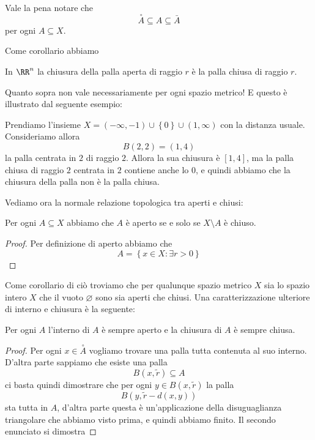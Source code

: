\documentclass[11pt]{scrartcl}
\newcommand{\eset}{\varnothing}
\begin{document}
	\begin{remark}
		Vale la pena notare che 
		$$\overset{\circ}{A}\subseteq A\subseteq \bar{A}$$
		per ogni $A\subseteq X$.
	\end{remark}
	Come corollario abbiamo
	\begin{corollary}
		In $\RR^n$ la chiusura della palla aperta di raggio $r$ è la palla chiusa di raggio $r$.
	\end{corollary}
	Quanto sopra non vale necessariamente per ogni spazio metrico! E questo è illustrato dal seguente esempio:
	\begin{example}
		Prendiamo l'insieme $X=(-\infty,-1)\cup \left\{0\right\}\cup \left(1,\infty\right)$ con la distanza usuale. Consideriamo allora 
		$$B(2,2)=(1,4)$$
		la palla centrata in $2$ di raggio $2$. Allora la sua chiusura è $[1,4]$, ma la palla chiusa di raggio $2$ centrata in $2$ contiene anche lo $0$, e quindi abbiamo che la chiusura della palla non è la palla chiusa.
	\end{example}
	Vediamo ora la normale relazione topologica tra aperti e chiusi:
	\begin{proposition}
		Per ogni $A\subseteq X$ abbiamo che $A$ è aperto se e solo se $X\setminus A$ è chiuso.
	\end{proposition}
	\begin{proof}
		Per definizione di aperto abbiamo che 
		$$A=\left\{x\in X:\exists r>0 \right\}$$
	\end{proof}
	Come corollario di ciò troviamo che per qualunque spazio metrico $X$ sia lo spazio intero $X$ che il vuoto $\eset$ sono sia aperti che chiusi. Una caratterizzazione ulteriore di interno e chiusura è la seguente:
	\begin{proposition}
		Per ogni $A$ l'interno di $A$ è sempre aperto e la chiusura di $A$ è sempre chiusa.
	\end{proposition}
	\begin{proof}
		Per ogni $x\in \overset{\circ}{A}$ vogliamo trovare una palla tutta contenuta al suo interno. D'altra parte sappiamo che esiste una palla 
		$$B(x,\tilde{r})\subseteq A$$
		ci basta quindi dimostrare che per ogni $y\in B(x,\tilde{r})$ la palla 
		$$B(y,\tilde{r}-d(x,y))$$
		sta tutta in $A$, d'altra parte questa è un'applicazione della disuguaglianza triangolare che abbiamo visto prima, e quindi abbiamo finito. Il secondo enunciato si dimostra 
	\end{proof}
\end{document}
